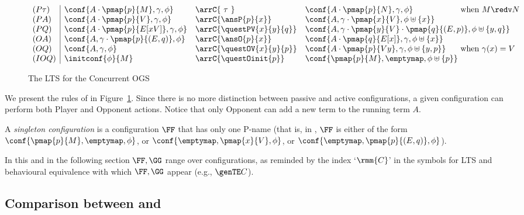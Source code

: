 \begin{figure}
 \[\begin{array}{l|lll@{}l}
   (P\tau) & \conf{A \cdot \pmap{p}{M},\gamma,\phi} & \arrC{\ \tau \ } & 
     \conf{A \cdot \pmap{p}{N},\gamma,\phi} & \text{ when } M \redv N\\
%
   (PA) & \conf{A \cdot \pmap{p}{V},\gamma,\phi} & \arrC{\ansP{p}{x}} & 
     \conf{A,\gamma \cdot \pmap{x}{V},\phi \uplus \{x\}} \\
%
   (PQ) & \conf{A \cdot \pmap{p}{E[xV]},\gamma,\phi} & \arrC{\questPV{x}{y}{q}} & 
     \multicolumn{2}{l}{\conf{A,\gamma \cdot \pmap{y}{V} \cdot \pmap{q}{(E,p)},
     \phi \uplus \{y,q\}}} \\
%
   (OA) & \conf{A,\gamma\cdot\pmap{p}{(E,q)},\phi} & \arrC{\ansO{p}{x}} & 
     \conf{A \cdot \pmap{q}{E[x]},\gamma,\phi \uplus \{x\}} \\
%
   (OQ) & \conf{A,\gamma,\phi} & \arrC{\questOV{x}{y}{p}} & 
     \conf{A \cdot \pmap{p}{V y},\gamma,\phi \uplus \{y,p\}} 
     & \text{ when } \gamma(x) = V\\
   (IOQ) & \initconf{\phi}{M} & \arrC{\questOinit{p}} &
     \conf{\pmap{p}{M},\emptymap,\phi \uplus \{p\}}
  \end{array}\]
\caption{The LTS for the Concurrent OGS}
\label{fig:conc-ogs-lts}
\end{figure}
 
We present the rules of \COGS in Figure~\ref{fig:conc-ogs-lts}.
Since there is no more distinction between passive and active configurations,
a given configuration can perform both %
Player and Opponent actions.
Notice that only Opponent can add a new term to the running term $A$.

A  \emph{singleton configuration} is a configuration $\FF$
that has only one P-name (that is, in \COGS,  $\FF$ is either of the form 
$\conf{\pmap{p}{M},\emptymap,\phi}$, or  
$\conf{\emptymap,\pmap{x}{V},\phi}$, or $\conf{\emptymap,\pmap{p}{(E,q)},\phi}$).

In this and in the following section $\FF,\GG$ range over \COGS configurations, as reminded
by the index `$\rmm{C}$'
  in the symbols for LTS and behavioural equivalence with  which $\FF,\GG$ appear (e.g.,
  $\genTE C$).


\subsection{Comparison between \COGS and \piI}
\label{ss:compa_cogs_piI}

